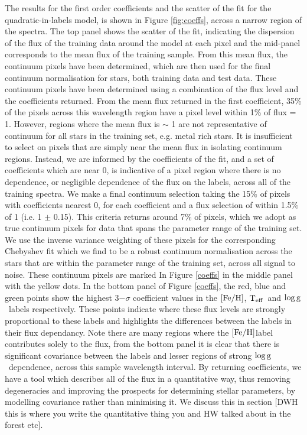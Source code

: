 \documentclass[12pt, preprint]{aastex}
\newcommand{\teff}{\mbox{$\rm T_{eff}$}}
\newcommand{\feh}{\mbox{$\rm [Fe/H]$}}
\newcommand{\logg}{\mbox{$\rm \log g$}}
\begin{document}
The results for the first order coefficients and the scatter of the fit for the quadratic-in-labels model, is shown in Figure \ref{fig:coeffs}, across a narrow region of the spectra. The top panel shows the scatter of the fit, indicating the dispersion of the flux of the training data around the model at each pixel and the mid-panel corresponds to the mean flux of the training sample. From this mean flux, the continuum pixels have been determined, which  are then used for the final continuum normalisation for stars, both training data and test data. These continuum pixels have been determined using a combination of the flux level and the coefficients returned.  From the mean flux returned in the first coefficient, 35\% of the pixels across this wavelength region have a pixel level within 1\% of flux = 1. However, regions where the mean flux is $\sim$ 1 are not representative of continuum for all stars in the training set, e.g. metal rich stars. It is insufficient to select on pixels that are simply near the mean flux in isolating continuum regions. Instead, we are informed by the coefficients of the fit, and a set of coefficients which are near 0, is indicative of a pixel region where there is no dependence, or negligible dependence of the flux on the labels, across all of the training spectra. We make a final continuum selection taking the 15\% of pixels with coefficients nearest 0, for each coefficient and a flux selection of within 1.5\% of 1 (i.e. 1 $\pm$ 0.15). This criteria returns around  7\% of pixels, which we adopt as true continuum pixels for data that spans the parameter range of the training set. We use the inverse variance weighting of these pixels for the corresponding Chebyshev fit which we find to be a robust continuum normalisation across the stars that are within the parameter range of the training set, across all signal to noise. These continuum pixels are marked In Figure \ref{coeffs} in the middle panel with the yellow dots. In the bottom panel of Figure \ref{coeffs}, the red, blue and green points show the highest 3$-\sigma$ coefficient values in the \feh, \teff\ and \logg\ labels respectively. These points indicate where these flux levels are strongly proportional to these labels and highlights the differences between the labels in their flux dependancy. Note there are many regions where the \feh label contributes solely to the flux, from the bottom panel it is clear that there is significant covariance between the labels and lesser regions of strong \logg\ dependence, across this sample wavelength interval. By returning coefficients, we have a tool which describes all of the flux in a quantitative way, thus removing degeneracies and improving the prospects for determining stellar parameters, by modelling covariance rather than minimising it. We discuss this in section [DWH this is where you write the quantitative thing you and HW talked about in the forest etc].
\end{document}
